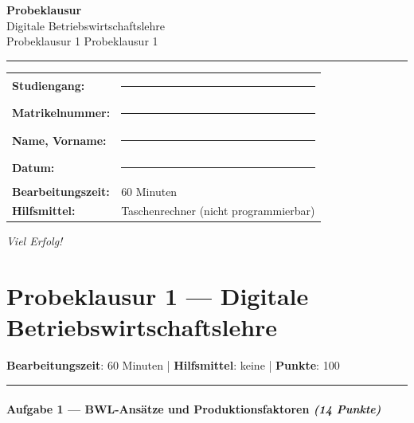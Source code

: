 \documentclass[11pt, a4paper]{article}
\providecommand{\nichttitle}{Probeklausur}
\providecommand{\nichtsubtitle}{}
\renewcommand{\nichttitle}{Digitale Betriebswirtschaftslehre}
\renewcommand{\nichtsubtitle}{Probeklausur 1}
\begin{document}
\thispagestyle{empty}
\begin{center}
\vspace*{1cm}
{\Huge\bfseries\color{accent}Probeklausur}\\[8pt]
{\Large\color{accent}\nichttitle}\\[4pt]
\ifx\nichtsubtitle\empty\else
  {\large\color{accent!80!black}\nichtsubtitle}\\[6pt]
\fi
\color{accent}\rule{0.5\linewidth}{1pt}\color{black}
\end{center}

\vspace{1cm}
\begin{tabularx}{\textwidth}{@{}l X@{}}
\textbf{Studiengang:}      & \rule{6cm}{0.4pt} \\[6pt]
\textbf{Matrikelnummer:}    & \rule{6cm}{0.4pt} \\[6pt]
\textbf{Name, Vorname:}    & \rule{6cm}{0.4pt} \\[6pt]
\textbf{Datum:}             & \rule{6cm}{0.4pt} \\[6pt]
\textbf{Bearbeitungszeit:}  & 60 Minuten \\[6pt]
\textbf{Hilfsmittel:}       & Taschenrechner (nicht programmierbar) \\
\end{tabularx}

\vspace{2cm}
\begin{center}
{\large\itshape Viel Erfolg!}
\end{center}

\newpage


\section{Probeklausur 1 — Digitale Betriebswirtschaftslehre}

\textbf{Bearbeitungszeit}: 60 Minuten | \textbf{Hilfsmittel}: keine | \textbf{Punkte}: 100



\noindent\textcolor{rulegray}{\rule{\linewidth}{0.4pt}}


\paragraph{Aufgabe 1 — BWL-Ansätze und Produktionsfaktoren \textit{(14 Punkte)}}\mbox{}\\[2pt]
\end{document}
